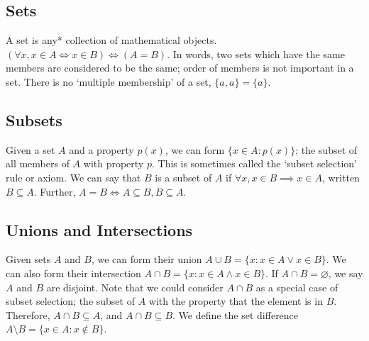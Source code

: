 \subsection{Sets}
A set is any* collection of mathematical objects. $(\forall x, x \in A \iff x \in B) \iff (A = B)$. In words, two sets which have the same members are considered to be the same; order of members is not important in a set. There is no `multiple membership' of a set, $\{ a, a \} = \{ a \}$.

\subsection{Subsets}
Given a set $A$ and a property $p(x)$, we can form $\{ x \in A: p(x) \}$; the subset of all members of $A$ with property $p$. This is sometimes called the `subset selection' rule or axiom. We can say that $B$ is a subset of $A$ if $\forall x, x \in B \implies x \in A$, written $B \subseteq A$. Further, $A = B \iff A \subseteq B, B \subseteq A$.

\subsection{Unions and Intersections}
Given sets $A$ and $B$, we can form their union $A \cup B = \{ x: x \in A \lor x \in B \}$. We can also form their intersection $A \cap B = \{ x: x \in A \wedge x \in B \}$. If $A \cap B = \varnothing$, we say $A$ and $B$ are disjoint. Note that we could consider $A \cap B$ as a special case of subset selection; the subset of $A$ with the property that the element is in $B$. Therefore, $A \cap B \subseteq A$, and $A \cap B \subseteq B$. We define the set difference $A \setminus B = \{ x \in A: x \notin B \}$.

